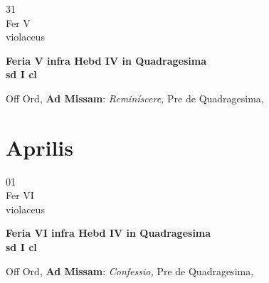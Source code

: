 \documentclass[10pt, openany]{book}
\begin{document}
        \begin{center}
            \begin{minipage}{3.5in}
                \vspace{2em}
                \begin{minipage}{0.5in}
                    {\Huge 31} \\
                    {\normalsize Fer V} \\
                    {\normalsize violaceus}
                \end{minipage}
                \begin{minipage}{3.0in}
                    \textbf{ \large Feria V infra Hebd IV in Quadragesima  \\
                    \textnormal{\normalsize sd I cl}} \\ 
                \end{minipage}
                \begin{justify}Off Ord, \textbf{Ad Missam}: \textit{Reminíscere,} Pre de Quadragesima,  
                \end{justify}
            \end{minipage}
        \end{center}
    
        \chapter{Aprilis}
                        
        \begin{center}
            \begin{minipage}{3.5in}
                \vspace{2em}
                \begin{minipage}{0.5in}
                    {\Huge 01} \\
                    {\normalsize Fer VI} \\
                    {\normalsize violaceus}
                \end{minipage}
                \begin{minipage}{3.0in}
                    \textbf{ \large Feria VI infra Hebd IV in Quadragesima  \\
                    \textnormal{\normalsize sd I cl}} \\ 
                \end{minipage}
                \begin{justify}Off Ord, \textbf{Ad Missam}: \textit{Confessio,} Pre de Quadragesima,  
                \end{justify}
            \end{minipage}
        \end{center}
    
\end{document}
